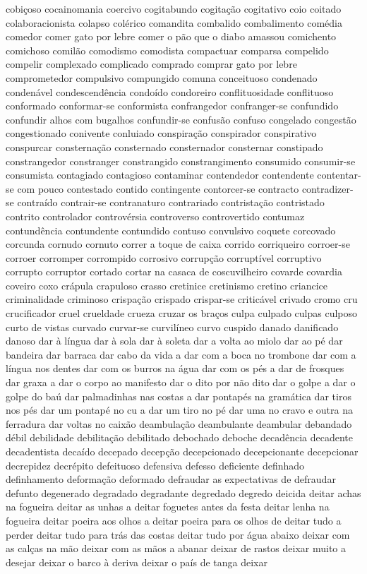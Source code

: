 \begin{appendices}
cobi\c{c}oso cocainomania coercivo cogitabundo cogita\c{c}\~ao cogitativo coio coitado colaboracionista colapso col\'{e}rico comandita combalido combalimento com\'{e}dia comedor comer gato por lebre comer o p\~ao que o diabo amassou comichento comichoso comil\~ao comodismo comodista compactuar comparsa compelido compelir complexado complicado comprado comprar gato por lebre comprometedor compulsivo compungido comuna conceituoso condenado conden\'{a}vel condescend\^{e}ncia condo\'{i}do condoreiro conflituosidade conflituoso conformado conformar-se conformista confrangedor confranger-se confundido confundir alhos com bugalhos confundir-se confus\~ao confuso congelado congest\~ao congestionado conivente conluiado conspira\c{c}\~ao conspirador conspirativo conspurcar consterna\c{c}\~ao consternado consternador consternar constipado constrangedor constranger constrangido constrangimento consumido consumir-se consumista contagiado contagioso contaminar contendedor contendente contentar-se com pouco contestado contido contingente contorcer-se contracto contradizer-se contra\'{i}do contrair-se contranaturo contrariado contrista\c{c}\~ao contristado contrito controlador controv\'{e}rsia controverso controvertido contumaz contund\^{e}ncia contundente contundido contuso convulsivo coquete corcovado corcunda cornudo cornuto correr a toque de caixa corrido corriqueiro corroer-se corroer corromper corrompido corrosivo corrup\c{c}\~ao corrupt\'{i}vel corruptivo corrupto corruptor cortado cortar na casaca de coscuvilheiro covarde covardia coveiro coxo cr\'{a}pula crapuloso crasso cretinice cretinismo cretino criancice criminalidade criminoso crispa\c{c}\~ao crispado crispar-se critic\'{a}vel crivado cromo cru crucificador cruel crueldade crueza cruzar os bra\c{c}os culpa culpado culpas culposo curto de vistas curvado curvar-se curvil\'{i}neo curvo cuspido danado danificado danoso dar \`{a} l\'{i}ngua dar \`{a} sola dar \`{a} soleta dar a volta ao miolo dar ao p\'{e} dar bandeira dar barraca dar cabo da vida a dar com a boca no trombone dar com a l\'{i}ngua nos dentes dar com os burros na \'{a}gua dar com os p\'{e}s a dar de frosques dar graxa a dar o corpo ao manifesto dar o dito por n\~ao dito dar o golpe a dar o golpe do ba\'{u} dar palmadinhas nas costas a dar pontap\'{e}s na gram\'{a}tica dar tiros nos p\'{e}s dar um pontap\'{e} no cu a dar um tiro no p\'{e} dar uma no cravo e outra na ferradura dar voltas no caix\~ao deambula\c{c}\~ao deambulante deambular debandado d\'{e}bil debilidade debilita\c{c}\~ao debilitado debochado deboche decad\^{e}ncia decadente decadentista deca\'{i}do decepado decep\c{c}\~ao decepcionado decepcionante decepcionar decrepidez decr\'{e}pito defeituoso defensiva defesso deficiente definhado definhamento deforma\c{c}\~ao deformado defraudar as expectativas de defraudar defunto degenerado degradado degradante degredado degredo deicida deitar achas na fogueira deitar as unhas a deitar foguetes antes da festa deitar lenha na fogueira deitar poeira aos olhos a deitar poeira para os olhos de deitar tudo a perder deitar tudo para tr\'{a}s das costas deitar tudo por \'{a}gua abaixo deixar com as cal\c{c}as na m\~ao deixar com as m\~aos a abanar deixar de rastos deixar muito a desejar deixar o barco \`{a} deriva deixar o pa\'{i}s de tanga deixar 
\end{appendices}
